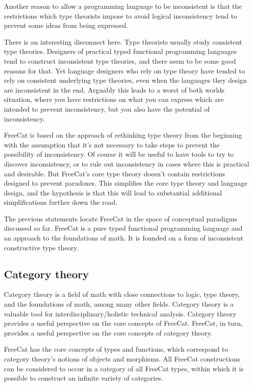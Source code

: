 \documentclass{article}
\begin{document}
Another reason to allow a programming language to be inconsistent is that the restrictions which type theorists impose to avoid logical inconsistency tend to prevent some ideas from being expressed.

There is an interesting disconnect here. Type theorists usually study consistent type theories. Designers of practical typed functional programming languages tend to construct inconsistent type theories, and there seem to be some good reasons for that. Yet language designers who rely on type theory have tended to rely on consistent underlying type theories, even when the languages they design are inconsistent in the end. Arguably this leads to a worst of both worlds situation, where you have restrictions on what you can express which are intended to prevent inconsistency, but you also have the potential of inconsistency.

FreeCat is based on the approach of rethinking type theory from the beginning with the assumption that it's not necessary to take steps to prevent the possibility of inconsistency. Of course it will be useful to have tools to try to discover inconsistency, or to rule out inconsistency in cases where this is practical and desirable. But FreeCat's core type theory doesn't contain restrictions designed to prevent paradoxes. This simplifies the core type theory and language design, and the hypothesis is that this will lead to substantial additional simplifications further down the road.

The previous statements locate FreeCat in the space of conceptual paradigms discussed so far. FreeCat is a pure typed functional programming language and an approach to the foundations of math. It is founded on a form of inconsistent constructive type theory.

\subsection{Category theory}

Category theory is a field of math with close connections to logic, type theory, and the foundations of math, among many other fields. Category theory is a valuable tool for interdisciplinary/holistic technical analysis. Category theory provides a useful perspective on the core concepts of FreeCat. FreeCat, in turn, provides a useful perspective on the core concepts of category theory.

FreeCat has the core concepts of types and functions, which correspond to category theory's notions of objects and morphisms. All FreeCat constructions can be considered to occur in a category of all FreeCat types, within which it is possible to construct an infinite variety of categories.
\end{document}
